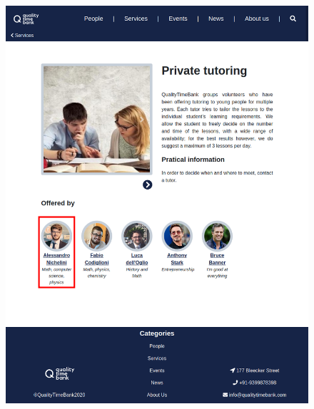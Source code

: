 \documentclass[a4paper, 11pt, parskip=half, headsepline]{scrreprt}
\begin{document}
\begin{figure}[H]
    \begin{minipage}[t]{0.5\textwidth}
        \centering
    	\includegraphics[width=1\linewidth, keepaspectratio]{scenarios/scenario-13}
    	\caption{}
    	\label{fig:scenario-13}
    \end{minipage}
    \hspace*{\fill}
    \begin{minipage}[t]{0.5\textwidth}
        \centering

\end{minipage}
\end{figure}
\end{document}
